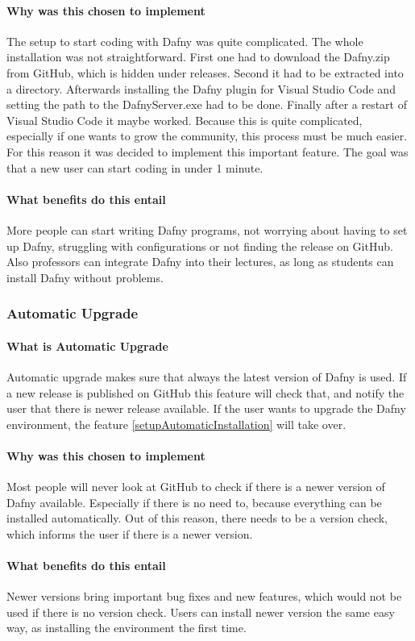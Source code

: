 \paragraph{Why was this chosen to implement}
The setup to start coding with Dafny was quite complicated. The whole installation was not straightforward. First one had to download the Dafny.zip from GitHub, which is hidden under releases. Second it had to be extracted into a directory. Afterwards installing the Dafny plugin for Visual Studio Code and setting the path to the DafnyServer.exe had to be done. Finally after a restart of Visual Studio Code it maybe worked. \newline
Because this is quite complicated, especially if one wants to grow the community, this process must be much easier. For this reason it was decided to implement this important feature. The goal was that a new user can start coding in under 1 minute. 
\paragraph{What benefits do this entail}
More people can start writing Dafny programs, not worrying about having to set up Dafny, struggling with configurations or not finding the release on GitHub. Also professors can integrate Dafny into their lectures, as long as students can install Dafny without problems. 
\subsubsection{Automatic Upgrade} \label{setupAutomaticUpgrade}
\paragraph{What is Automatic Upgrade}
Automatic upgrade makes sure that always the latest version of Dafny is used. If a new release is published on GitHub this feature will check that, and notify the user that there is newer release available. If the user wants to upgrade the Dafny environment, the feature \ref{setupAutomaticInstallation} will take over. 
\paragraph{Why was this chosen to implement}
Most people will never look at GitHub to check if there is a newer version of Dafny available. Especially if there is no need to, because everything can be installed automatically. Out of this reason, there needs to be a version check, which informs the user if there is a newer version. 
\paragraph{What benefits do this entail}
Newer versions bring important bug fixes and new features, which would not be used if there is no version check. Users can install newer version the same easy way, as installing the environment the first time.  
